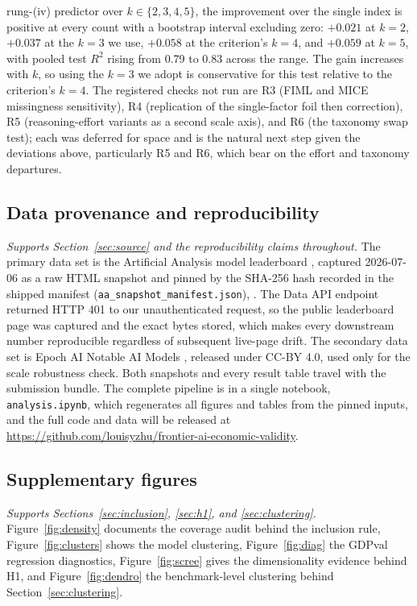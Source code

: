 rung-(iv) predictor over $k \in \{2,3,4,5\}$, the improvement over the single index is positive at every
count with a bootstrap interval excluding zero: $+0.021$ at $k=2$, $+0.037$ at the $k=3$ we use, $+0.058$
at the criterion's $k=4$, and $+0.059$ at $k=5$, with pooled test $R^2$ rising from 0.79 to 0.83 across
the range. The gain increases with $k$, so using the $k=3$ we adopt is conservative for this test
relative to the criterion's $k=4$.
The registered checks not run are R3 (FIML and MICE missingness sensitivity), R4 (replication of the
single-factor foil then correction), R5 (reasoning-effort variants as a second scale axis), and R6 (the
taxonomy swap test); each was deferred for space and is the natural next step given the deviations above,
particularly R5 and R6, which bear on the effort and taxonomy departures.

\subsection{Data provenance and reproducibility}\label{app:provenance}
\emph{Supports Section~\ref{sec:source} and the reproducibility claims throughout.} The primary data set
is the Artificial Analysis model leaderboard \cite{aa2026}, captured 2026-07-06 as a raw HTML snapshot
and pinned by the SHA-256 hash recorded in the shipped manifest
(\texttt{aa\_snapshot\_manifest.json}),
\texttt{}. The Data API endpoint returned
HTTP 401 to our unauthenticated request, so the public leaderboard page was captured and the exact bytes
stored, which makes every downstream number reproducible regardless of subsequent live-page drift. The
secondary data set is Epoch AI Notable AI Models \cite{epoch2026}, released under CC-BY 4.0, used only
for the scale robustness check. Both snapshots and every result table travel with the submission bundle.
The complete pipeline is in a single notebook, \texttt{analysis.ipynb}, which regenerates all
figures and tables from the pinned inputs, and the full code and data will be released at
\url{https://github.com/louisyzhu/frontier-ai-economic-validity}.

\subsection{Supplementary figures}\label{app:figures}
\emph{Supports Sections~\ref{sec:inclusion}, \ref{sec:h1}, and \ref{sec:clustering}.}
Figure~\ref{fig:density} documents the coverage audit behind the inclusion rule, Figure~\ref{fig:clusters}
shows the model clustering, Figure~\ref{fig:diag} the GDPval regression diagnostics, Figure~\ref{fig:scree} gives the dimensionality evidence behind H1, and
Figure~\ref{fig:dendro} the benchmark-level clustering behind Section~\ref{sec:clustering}.

